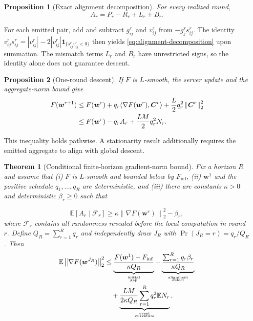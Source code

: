 \documentclass[conference]{IEEEtran}
\newcommand{\E}{\mathbb{E}}
\newcommand{\norm}[1]{\left\lVert#1\right\rVert}
\newcommand{\ind}[1]{\mathbf{1}_{\{#1\}}}
\newcommand{\vect}[1]{\boldsymbol{#1}}
\newcommand{\rev}[1]{#1}
\newcommand{\reviewrev}[1]{#1}
\newtheorem{proposition}{Proposition}
\newtheorem{theorem}{Theorem}
\begin{document}
\begin{proposition}[Exact alignment decomposition]
For every realized round,
\begin{equation}
 A_r=P_r-R_r+L_r+B_r.
 \label{eq:alignment-decomposition}
\end{equation}
\end{proposition}
For each emitted pair, add and subtract $g_{ij}^r$ and $v_{ij}^r$
from $-g_j^rs_{ij}^r$. The identity
$v_{ij}^rs_{ij}^r=|v_{ij}^r|-2|v_{ij}^r|
\ind{s_{ij}^rv_{ij}^r<0}$ then yields
\eqref{eq:alignment-decomposition} upon summation.
The mismatch terms $L_r$ and $B_r$ have unrestricted signs,
so the identity alone does not guarantee descent.

\begin{proposition}[\rev{One-round descent}]
If $F$ is $L$-smooth, the server update and the aggregate-norm bound give
\vspace{-3pt}
\begin{align}
 F(\vect{w}^{r+1})
 &\leq F(\vect{w}^r)+q_r\langle\nabla F(\vect{w}^r),\vect{C}^r\rangle
 +\frac{L}{2}q_r^2\norm{\vect{C}^r}_2^2 \notag\\
 &\leq F(\vect{w}^r)-q_rA_r+\frac{LM}{2}q_r^2N_r.
 \label{eq:descent}
\end{align}
\end{proposition}
\rev{This inequality holds pathwise. A stationarity result additionally
requires the emitted aggregate to align with global descent.}

\begin{theorem}[\reviewrev{Conditional finite-horizon gradient-norm bound}]
\label{thm:conditional-stationarity}
\rev{Fix a horizon $R$ and assume that (i) $F$ is $L$-smooth and bounded below by
$F_{\inf}$, (ii) $\vect{w}^1$ and the positive schedule
$q_1,\ldots,q_R$ are deterministic, and (iii) there are constants $\kappa>0$
and deterministic $\beta_r\geq0$ such that
}
\begin{equation}
 \rev{\E[A_r\mid\mathcal{F}_r]\geq
 \kappa\norm{\nabla F(\vect{w}^r)}_2^2-\beta_r,}
 \label{eq:alignment-assumption-paper}
\end{equation}
\rev{where $\mathcal{F}_r$ contains all randomness revealed before the local
computation in round $r$. Define $Q_R=\sum_{r=1}^Rq_r$ and independently draw
$J_R$ with $\Pr(J_R=r)=q_r/Q_R$. Then}
\begin{align}
 \E\norm{\nabla F(\vect{w}^{J_R})}_2^2
 &\leq
 \underbrace{\frac{F(\vect{w}^1)-F_{\inf}}{\kappa Q_R}}_{
   \substack{\scriptscriptstyle\text{initial}\\[-2pt]\scriptscriptstyle\text{gap}}}
 + \underbrace{\frac{\sum_{r=1}^Rq_r\beta_r}{\kappa Q_R}}_{
   \substack{\scriptscriptstyle\text{alignment}\\[-2pt]\scriptscriptstyle\text{defect}}}
 \notag\\
 &\quad+
 \underbrace{\frac{LM}{2\kappa Q_R}
 \sum_{r=1}^Rq_r^2\E N_r}_{
   \substack{\scriptscriptstyle\text{event}\\[-2pt]\scriptscriptstyle\text{curvature}}}.
 \label{eq:stationarity}
\end{align}
\end{theorem}
\end{document}
